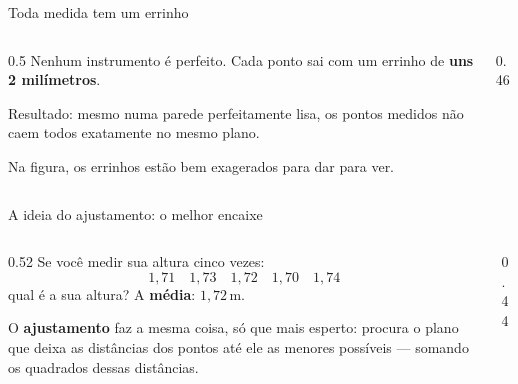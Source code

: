 \documentclass[aspectratio=169,11pt]{beamer}
\newcommand{\bnum}[1]{\textbf{\textcolor{mTeal}{#1}}}
\begin{document}
\begin{frame}{Toda medida tem um errinho}
  \begin{columns}[c]
    \begin{column}{0.5\textwidth}
      Nenhum instrumento é perfeito. Cada ponto sai com um errinho de
      \bnum{uns 2 milímetros}.
      \bigskip

      Resultado: mesmo numa parede perfeitamente lisa, os pontos medidos
      \alert{não caem todos exatamente no mesmo plano}.
      \bigskip

      \small\textcolor{mStoneMid}{Na figura, os errinhos estão bem exagerados para dar para ver.}
    \end{column}
    \begin{column}{0.46\textwidth}
      \centering
    \end{column}
  \end{columns}
\end{frame}

\begin{frame}{A ideia do ajustamento: o melhor encaixe}
  \begin{columns}[c]
    \begin{column}{0.52\textwidth}
      Se você medir sua altura cinco vezes:
      \[ 1{,}71 \quad 1{,}73 \quad 1{,}72 \quad 1{,}70 \quad 1{,}74 \]
      qual é a sua altura? A \bnum{média}: $1{,}72$\,m.
      \bigskip

      O \bnum{ajustamento} faz a mesma coisa, só que mais esperto:
      procura o plano que deixa as distâncias dos pontos até ele
      \alert{as menores possíveis} --- somando os quadrados dessas distâncias.
    \end{column}
    \begin{column}{0.44\textwidth}
      \centering
    \end{column}
  \end{columns}
\end{frame}
\end{document}
